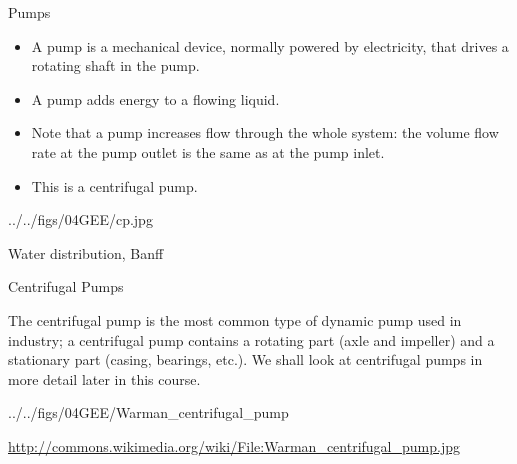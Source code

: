 \documentclass[9pt,xcolor={svgnames, x11names},professionalfonts, mathserif]{beamer}
\begin{document}
\begin{frame}{Pumps}
	\begin{minipage}{0.45\textwidth}
		\raggedright
		\begin{itemize}
			\item A pump is a mechanical device, normally powered by electricity, that drives a rotating shaft in the pump.
			\item A pump adds energy to a flowing liquid.
			\item Note that a pump increases flow through the whole system: the volume flow rate at the pump outlet is the same as at the pump inlet.
			\item This is a centrifugal pump.
		\end{itemize}
	\end{minipage}
	\hfill
	\begin{minipage}{0.5\textwidth}
		\begin{cfig}[0.26]{../../figs/04GEE/cp.jpg}\end{cfig}
		\vspace{-1.0em}
		\centering
		{\tiny  Water distribution, Banff}
	\end{minipage}
	
\end{frame}


\begin{frame}{Centrifugal Pumps}
	
	\begin{minipage}[c]{0.4\columnwidth}%
		\raggedright
		The centrifugal pump is the most common type of dynamic pump used
		in industry; a centrifugal pump contains a rotating part (axle and
		impeller) and a stationary part (casing, bearings, etc.).
		\parm
		We shall look at centrifugal pumps in more detail later in this course.
		
	\end{minipage}
	\hfill{}%
	\begin{minipage}[c]{0.55\columnwidth}%
		
		\begin{cfig}[0.15]{../../figs/04GEE/Warman_centrifugal_pump}\end{cfig}
		\centering
		\vspace{-0.9em}
		\tiny \url{http://commons.wikimedia.org/wiki/File:Warman\_centrifugal\_pump.jpg}
	\end{minipage}
	
\end{frame}
\end{document}
